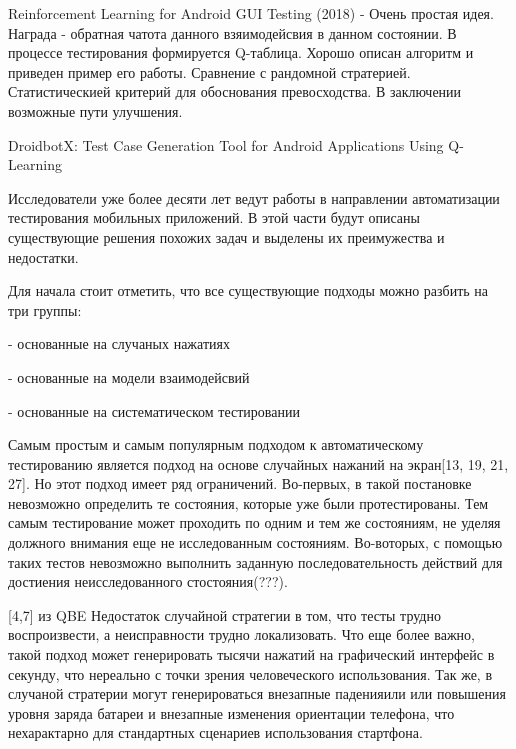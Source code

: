 Reinforcement Learning for Android GUI Testing (2018) - Очень простая идея. Награда - обратная чатота данного взяимодейсвия в данном состоянии. В процессе тестирования формируется Q-таблица. Хорошо описан алгоритм и приведен пример его работы. Сравнение с рандомной стратерией. Статистическией критерий для обоснования превосходства. В заключении возможные пути улучшения.


DroidbotX: Test Case Generation Tool for Android Applications Using Q-Learning

Исследователи уже более десяти лет ведут работы в направлении автоматизации тестирования мобильных приложений. В этой части будут описаны существующие решения похожих задач и выделены их преимужества и недостатки.

Для начала стоит отметить, что все существующие подходы можно разбить на три группы:

- основанные на случаных нажатиях

- основанные на модели взаимодейсвий

- основанные на систематическом тестировании

Самым простым и самым популярным подходом к автоматическому тестированию является подход на основе случайных нажаний на экран[13, 19, 21, 27]. Но этот подход имеет ряд ограничений. Во-первых, в такой постановке невозможно определить те состояния, которые уже были протестированы. Тем самым тестирование может проходить по одним и тем же состояниям, не уделяя должного внимания еще не исследованным состояниям. Во-воторых, с помощью таких тестов невозможно выполнить заданную последовательность действий для достиения неисследованного стостояния(???).

[4,7] из QBE
Недостаток случайной стратегии в том, что
тесты трудно воспроизвести, а неисправности трудно локализовать. Что еще более важно, такой подход может генерировать тысячи нажатий на графический интерфейс в секунду, что нереально с точки зрения человеческого использования. Так же, в случаной стратерии могут генерироваться внезапные паденияили или повышения уровня заряда батареи и внезапные изменения ориентации телефона, что нехарактарно для стандартных сценариев использования стартфона.

